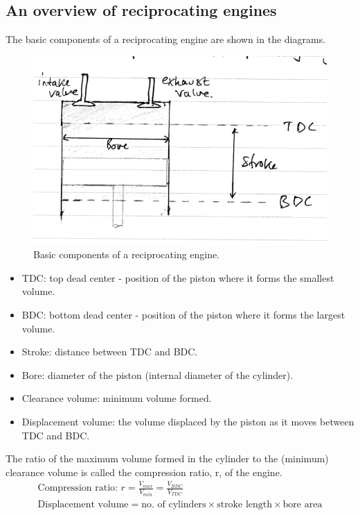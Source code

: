 \documentclass[class=report, crop=false, 12pt,a4paper]{standalone}
\begin{document}
\subsection{An overview of reciprocating engines}
The basic components of a reciprocating engine are shown in the diagrams.
\begin{figure}
  \centering
  \includegraphics[width = \textwidth]{../img/ReciprocatingEngineDiagram}
  \caption{Basic components of a reciprocating engine.}
\end{figure}
\begin{itemize}[noitemsep]
  \item TDC: top dead center - position of the piston where it forms the smallest volume.
  \item BDC: bottom dead center - position of the piston where it forms the largest volume.
  \item Stroke: distance between TDC and BDC.
  \item Bore: diameter of the piston (internal diameter of the cylinder).
  \item Clearance volume: minimum volume formed.
  \item Displacement volume: the volume displaced by the piston as it moves between TDC and BDC.
\end{itemize}
The ratio of the maximum volume formed in the cylinder to the (minimum) clearance volume is called the compression ratio, r, of the engine.
\begin{gather}
  \textrm{Compression ratio: } r = \frac{V_{max}}{V_{min}} = \frac{V_{BDC}}{V_{TDC}}\\
  \textrm{Displacement volume} = \textrm{no. of cylinders} \times \textrm{stroke length} \times \textrm{bore area}
\end{gather}
\end{document}

